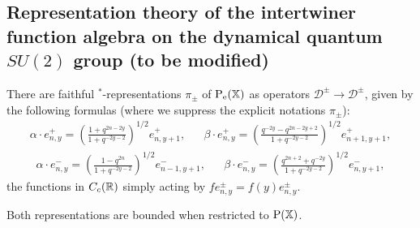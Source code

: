 


\subsection{Representation theory of the intertwiner function algebra on the dynamical quantum $SU(2)$ group (to be modified)}

\begin{Lem} There are faithful $^*$-representations $\pi_{\pm}$ of $\operatorname{\mathrm{P}}_{\operatorname{\mathrm{e}}}(\mathbb{X})$ as operators $\mathscr{D}^{\pm}\rightarrow \mathscr{D}^{\pm}$, given by the following formulas (where we suppress the explicit notations $\pi_{\pm}$): \begin{align*} \alpha\cdot e_{n,y}^+ = \left(\frac{1+q^{2n-2y}}{1+q^{-2y-2}}\right)^{1/2}e_{n,y+1}^+,&& \beta\cdot e_{n,y}^+ = \left(\frac{q^{-2y}-q^{2n-2y+2}}{1+q^{-2y-2}}\right)^{1/2}e_{n+1,y+1}^+,\end{align*}
\begin{align*} \alpha\cdot e_{n,y}^- = \left(\frac{1-q^{2n}}{1+q^{-2y-2}}\right)^{1/2}e_{n-1,y+1}^-,&& \beta\cdot e_{n,y}^- = \left(\frac{q^{2n+2}+q^{-2y}}{1+q^{-2y-2}}\right)^{1/2}e_{n,y+1}^-,\end{align*} the functions in $C_c(\mathbb{R})$ simply acting by $fe_{n,y}^{\pm}= f(y)e_{n,y}^{\pm}$.

Both representations are bounded when restricted to $\operatorname{\mathrm{P}}(\mathbb{X})$.
\end{Lem}





